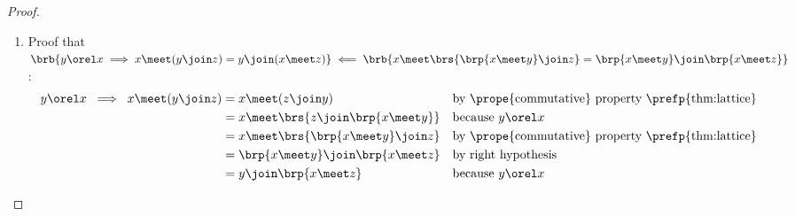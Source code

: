 \begin{proof}
\begin{enumerate}
\begin{enumerate}
      \item Proof that
              $\brb{y\orel x \implies x\meet(y\join z) = y \join (x\meet z) }
              \impliedby
              \brb{x \meet \brs{\brp{x\meet y}\join z} = \brp{x\meet y}\join\brp{x\meet z}}$:
        \begin{align*}
          y\orel x \;\implies\; x \meet (y\join z)
            &= x \meet (z\join y)
            && \text{by \prope{commutative} property \prefp{thm:lattice}}
          \\&= x \meet \brs{z\join \brp{x\meet y}}
            && \text{because $y\orel x$}
          \\&= x \meet \brs{\brp{x\meet y}\join z}
            && \text{by \prope{commutative} property \prefp{thm:lattice}}
          \\&= \brp{x\meet y}\join\brp{x\meet z}
            && \text{by right hypothesis}
          \\&= y \join \brp{x\meet z}
            && \text{because $y\orel x$}
        \end{align*}
    \end{enumerate}

\end{enumerate}
\end{proof}



\begin{minipage}{\tw-33mm}
\begin{definition}
\footnotemark
\label{def:lat_N5}
\label{def:n5}
\end{definition}
\end{minipage}%
%
\hspace{5mm}

